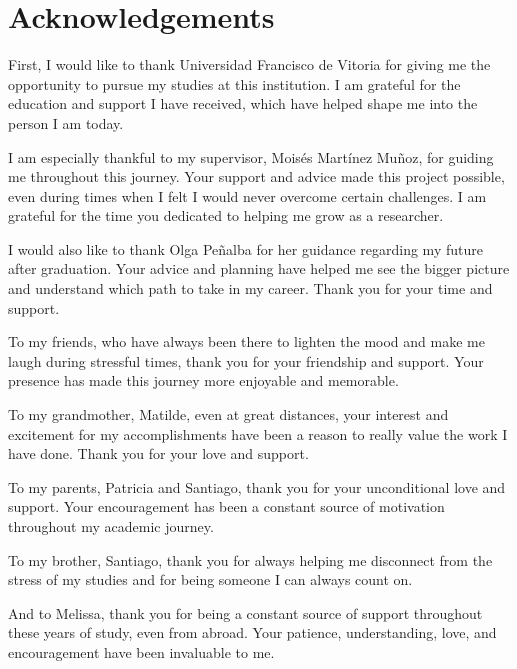 \chapter*{Acknowledgements}

First, I would like to thank Universidad Francisco de Vitoria for giving me the opportunity to pursue my studies at this institution. I am grateful for the education and support I have received, which have helped shape me into the person I am today.

I am especially thankful to my supervisor, Mois\'es Mart\'inez Mu\~noz, for guiding me throughout this journey. Your support and advice made this project possible, even during times when I felt I would never overcome certain challenges. I am grateful for the time you dedicated to helping me grow as a researcher.

I would also like to thank Olga Pe\~nalba for her guidance regarding my future after graduation. Your advice and planning have helped me see the bigger picture and understand which path to take in my career. Thank you for your time and support.

To my friends, who have always been there to lighten the mood and make me laugh during stressful times, thank you for your friendship and support. Your presence has made this journey more enjoyable and memorable.

To my grandmother, Matilde, even at great distances, your interest and excitement for my accomplishments have been a reason to really value the work I have done. Thank you for your love and support.

To my parents, Patricia and Santiago, thank you for your unconditional love and support. Your encouragement has been a constant source of motivation throughout my academic journey.

To my brother, Santiago, thank you for always helping me disconnect from the stress of my studies and for being someone I can always count on.

And to Melissa, thank you for being a constant source of support throughout these years of study, even from abroad. Your patience, understanding, love, and encouragement have been invaluable to me.